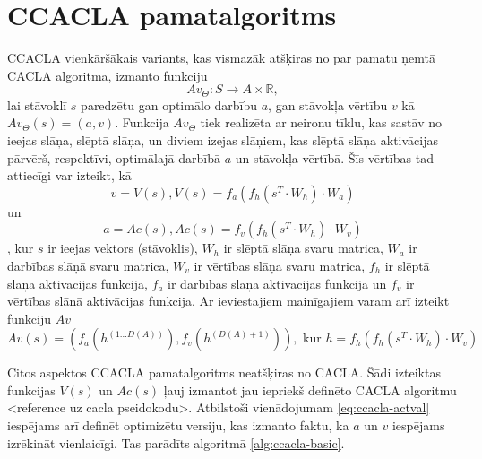 \documentclass{ludis} %
\begin{document}
\section{CCACLA pamatalgoritms}
CCACLA vienkāršākais variants, kas vismazāk atšķiras no par pamatu ņemtā CACLA
algoritma, izmanto funkciju 
\begin{equation}
  Av_\Theta:S \rightarrow A \times \mathbb{R},
\end{equation}
lai stāvoklī $s$ paredzētu gan optimālo darbību $a$, gan stāvokļa vērtību $v$ kā
$Av_\Theta(s) = (a, v)$. Funkcija $Av_\Theta$ tiek realizēta ar
neironu tīklu, kas sastāv no ieejas slāņa, slēptā slāņa, un diviem izejas
slāņiem, kas slēptā slāņa aktivācijas pārvērš, respektīvi, optimālajā darbībā
$a$ un stāvokļa vērtībā. Šīs vērtības tad attiecīgi var izteikt, kā
\begin{equation}\label{eq:ccacla-act}
  v = V(s), V(s) = f_a(f_h(s^T \cdot W_h) \cdot W_a)
\end{equation} un
\begin{equation}\label{eq:ccacla-val}
  a = Ac(s), Ac(s) = f_v(f_h(s^T \cdot W_h) \cdot W_v)
\end{equation}, kur $s$ ir
ieejas vektors (stāvoklis), $W_h$ ir slēptā slāņa svaru matrica, $W_a$ ir
darbības slāņā svaru matrica, $W_v$ ir vērtības slāņa svaru matrica, $f_h$ ir
slēptā slāņā aktivācijas funkcija, $f_a$ ir darbības slāņā aktivācijas funkcija
un $f_v$ ir vērtības slāņā aktivācijas funkcija. Ar ieviestajiem mainīgajiem
varam arī izteikt funkciju $Av$
\begin{equation}\label{eq:ccacla-actval}
  Av(s) = (f_a(h^{(1 \ldots D(A))}), f_v(h^{(D(A) + 1)})), \text{ kur } 
  h = f_h(f_h(s^T \cdot W_h) \cdot W_v)
\end{equation}

Citos aspektos CCACLA pamatalgoritms neatšķiras no CACLA. Šādi izteiktas funkcijas
$V(s)$ un $Ac(s)$ ļauj izmantot jau iepriekš definēto CACLA algoritmu <reference
uz cacla pseidokodu>. Atbilstoši vienādojumam \ref{eq:ccacla-actval} iespējams
arī definēt optimizētu versiju, kas izmanto faktu, ka $a$ un $v$ iespējams
izrēķināt vienlaicīgi. Tas parādīts algoritmā \ref{alg:ccacla-basic}.
\end{document}
